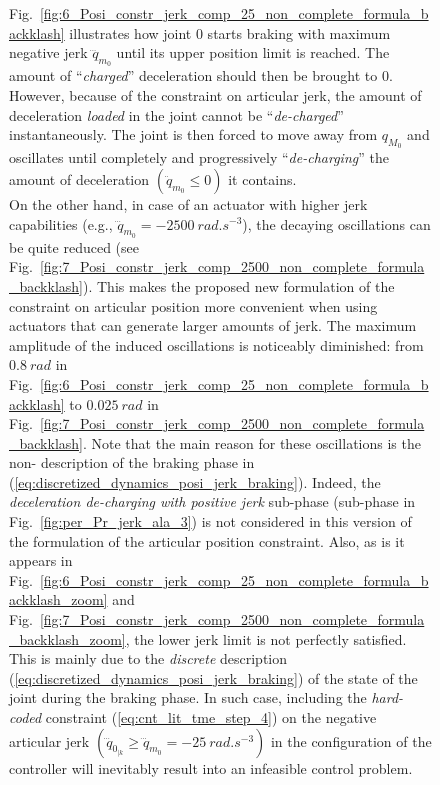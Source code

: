 \begin{figure}[!htbp]
Fig.~\ref{fig:6_Posi_constr_jerk_comp_25_non_complete_formula_backklash} illustrates how joint $0$ starts braking with maximum negative jerk $\dddot{q}_{m_{0}}$ until its upper position limit is reached. The amount of ``\textit{charged}'' deceleration should then be brought to $0$. However, because of the constraint on articular jerk, the amount of deceleration \textit{loaded} in the joint cannot be ``\textit{de-charged}'' instantaneously. The joint is then forced to move away from $q_{M_{0}}$ and oscillates until completely and progressively ``\textit{de-charging}'' the amount of deceleration $(\ddot{q}_{m_{0}} \leq 0)$ it contains. \\
On the other hand, in case of an actuator with higher jerk capabilities (e.g., $\dddot{q}_{m_{0}} = -2500 ~rad.s^{-3}$), the decaying oscillations can be quite reduced (see Fig.~\ref{fig:7_Posi_constr_jerk_comp_2500_non_complete_formula_backklash}).
This makes the proposed new formulation of the constraint on articular position more convenient when using actuators that can generate larger amounts of jerk. The maximum amplitude of the induced oscillations is noticeably diminished: from $0.8~rad$ in Fig.~\ref{fig:6_Posi_constr_jerk_comp_25_non_complete_formula_backklash} to $0.025~rad$ in Fig.~\ref{fig:7_Posi_constr_jerk_comp_2500_non_complete_formula_backklash}. Note that the main reason for these oscillations is the non- description of the braking phase in (\ref{eq:discretized_dynamics_posi_jerk_braking}). Indeed,  the \textit{deceleration de-charging with positive jerk} sub-phase (sub-phase  in Fig.~\ref{fig:per_Pr_jerk_ala_3}) is not considered in this version of the formulation of the articular position constraint. Also, as is it appears in Fig.~\ref{fig:6_Posi_constr_jerk_comp_25_non_complete_formula_backklash_zoom} and Fig.~\ref{fig:7_Posi_constr_jerk_comp_2500_non_complete_formula_backklash_zoom},  the lower jerk limit is not perfectly satisfied. This is mainly due to the \textit{discrete} description (\ref{eq:discretized_dynamics_posi_jerk_braking}) of the state of the joint during the braking phase. In such case, including the \textit{hard-coded} constraint (\ref{eq:cnt_lit_tme_step_4}) on the negative articular jerk $(\dddot{q}_{0_{|k}} \geq\dddot{q}_{m_{0}} = -25~rad.s^{-3})$ in the configuration of the controller will inevitably result into an infeasible control problem. 

\end{figure}
